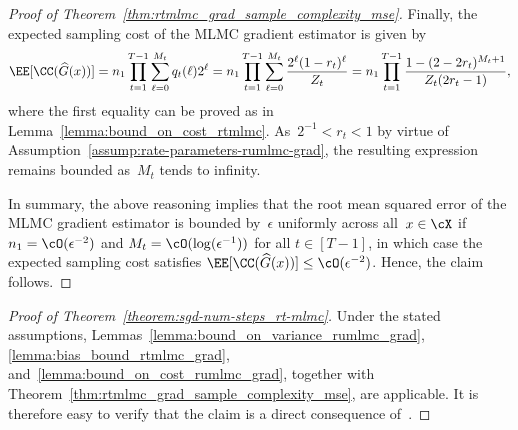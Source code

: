 \documentclass[11pt]{article}
\let\hat\widehat
\begin{document}
\begin{proof}[Proof of Theorem~\ref{thm:rtmlmc_grad_sample_complexity_mse}]
    Finally, the expected sampling cost of the MLMC gradient estimator is given by
    \begin{align*}
        \EE[\CC(\hat{G}(x))]= n_1 \prod_{t=1}^{T-1} \sum_{\ell=0}^{M_t} q_t(\ell)2^{\ell} = n_1 \prod_{t=1}^{T-1} \sum_{\ell=0}^{M_t} \frac{2^\ell(1-r_t)^\ell}{Z_t} = n_1 \prod_{t=1}^{T-1} \frac{1-(2-2r_t)^{M_t+1}}{Z_t (2r_t - 1)},
    \end{align*}
    where the first equality can be proved as in Lemma~\ref{lemma:bound_on_cost_rtmlmc}. As~$2^{-1}< r_t <1$ by virtue of Assumption~\ref{assump:rate-parameters-rumlmc-grad}, the resulting expression remains bounded as~$M_t$ tends to infinity. 
    
    In summary, the above reasoning implies that the root mean squared error of the MLMC gradient estimator is bounded by~$\epsilon$ uniformly across all~$x\in\cX$ if $n_1=\cO(\epsilon^{-2})$ and $M_t= \cO(\log(\epsilon^{-1}))$ for all $t \in [T-1]$, in which case the expected sampling cost satisfies $\EE[\CC(\hat{G}(x))] \leq \cO(\epsilon^{-2})$. Hence, the claim follows.
\end{proof}

\begin{proof}[Proof of Theorem~\ref{theorem:sgd-num-steps_rt-mlmc}]
   Under the stated assumptions, Lemmas~\ref{lemma:bound_on_variance_rumlmc_grad}, \ref{lemma:bias_bound_rtmlmc_grad}, and~\ref{lemma:bound_on_cost_rumlmc_grad}, together with Theorem~\ref{thm:rtmlmc_grad_sample_complexity_mse}, are applicable. It is therefore easy to verify that the claim is a direct consequence of~\cite[Theorem~C.1]{hu2021bias}.
\end{proof}

\end{document}
